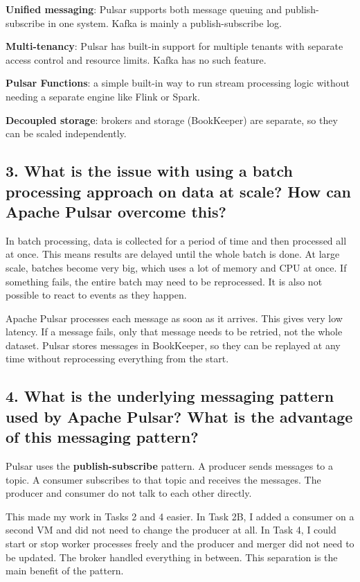 \documentclass[11pt,a4paper]{article}
\begin{document}
 \textbf{Unified messaging}: Pulsar supports both message queuing and publish-subscribe in
        one system. Kafka is mainly a publish-subscribe log.

  \textbf{Multi-tenancy}: Pulsar has built-in support for multiple tenants with
        separate access control and resource limits. Kafka has no such feature.
 
  \textbf{Pulsar Functions}: a simple built-in way to run stream processing logic
        without needing a separate engine like Flink or Spark.

  \textbf{Decoupled storage}: brokers and storage (BookKeeper) are separate, so
        they can be scaled independently.


\subsection*{3. What is the issue with using a batch processing approach on data at scale? How can Apache Pulsar overcome this?}

In batch processing, data is collected for a period of time and then processed all at once.
This means results are delayed until the whole batch is done. At large scale, batches
become very big, which uses a lot of memory and CPU at once. If something fails, the
entire batch may need to be reprocessed. It is also not possible to react to events as they happen.

Apache Pulsar processes each message as soon as it arrives. This gives very low latency.
If a message fails, only that message needs to be retried, not the whole dataset. Pulsar
stores messages in BookKeeper, so they can be replayed at any time without reprocessing
everything from the start.

\subsection*{4. What is the underlying messaging pattern used by Apache Pulsar? What is the advantage of this messaging pattern?}

Pulsar uses the \textbf{publish-subscribe} pattern. A producer sends messages to a topic.
A consumer subscribes to that topic and receives the messages. The producer and consumer
do not talk to each other directly.

This made my work in Tasks 2 and 4 easier. In Task 2B, I added a consumer on a second
VM and did not need to change the producer at all. In Task 4, I could start or stop worker
processes freely and the producer and merger did not need to be updated. The broker
handled everything in between. This separation is the main benefit of the pattern.
\end{document}

